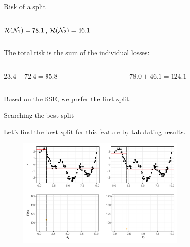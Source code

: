 \documentclass[11pt,compress,t,notes=noshow, xcolor=table]{beamer}
\begin{document}
\begin{vbframe}{Risk of a split}
\begin{columns}
\begin{column}{0.5\textwidth}
$\mathcal{R}(\mathcal{N}_1) = 78.1$, $\mathcal{R}(\mathcal{N}_2) = 46.1$

\end{column}
\end{columns}
\vspace{0.1in}

The total risk is the sum of the individual losses: %
\vspace{0.1in}

\begin{columns}
\begin{column}{0.5\textwidth}
$23.4 + 72.4 = 95.8$
\end{column}

\begin{column}{0.5\textwidth}
$78.0 + 46.1 = 124.1$ 
\end{column}
\end{columns}

\vspace{0.1in}
Based on the SSE, we prefer the first split.

\end{vbframe}

\begin{vbframe}{Searching the best split}

Let's find the best split for this feature by tabulating results.

\begin{figure}
\includegraphics[width=0.75\textwidth]{figure/splitcrit_optimal-constant-grid.pdf} 
\end{figure}


\end{vbframe}
\end{document}
